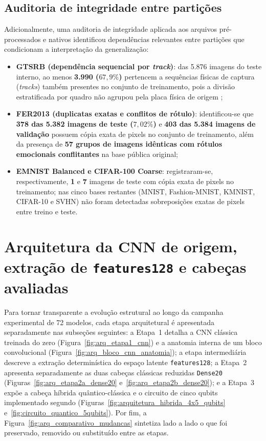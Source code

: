 \documentclass[
    12pt,
    openright,
    oneside,
    a4paper,
    english,
    brazil
]{abntex2}
\begin{document}
\subsection{Auditoria de integridade entre partições}
\label{subsec:auditoria_integridade}

Adicionalmente, uma auditoria de integridade aplicada aos arquivos pré-processados e nativos identificou dependências relevantes entre partições que condicionam a interpretação da generalização:
\begin{itemize}
    \item \textbf{GTSRB (dependência sequencial por \textit{track})}: das 5.876 imagens do teste interno, ao menos \textbf{3.990 (\(67{,}9\%\))} pertencem a sequências físicas de captura (\textit{tracks}) também presentes no conjunto de treinamento, pois a divisão estratificada por quadro não agrupou pela placa física de origem \cite{stallkamp2012gtsrb};
    \item \textbf{FER2013 (duplicatas exatas e conflitos de rótulo)}: identificou-se que \textbf{378 das 5.382 imagens de teste (\(7{,}02\%\))} e \textbf{403 das 5.384 imagens de validação} possuem cópia exata de pixels no conjunto de treinamento, além da presença de \textbf{57 grupos de imagens idênticas com rótulos emocionais conflitantes} na base pública original;
    \item \textbf{EMNIST Balanced e CIFAR-100 Coarse}: registraram-se, respectivamente, \textbf{1} e \textbf{7} imagens de teste com cópia exata de pixels no treinamento; nas cinco bases restantes (MNIST, Fashion-MNIST, KMNIST, CIFAR-10 e SVHN) não foram detectadas sobreposições exatas de pixels entre treino e teste.
\end{itemize}

\section{Arquitetura da CNN de origem, extração de \texttt{features128} e cabeças avaliadas}

Para tornar transparente a evolução estrutural ao longo da campanha experimental de 72 modelos, cada etapa arquitetural é apresentada separadamente nas subseções seguintes: a Etapa~1 detalha a CNN clássica treinada do zero (Figura~\ref{fig:arq_etapa1_cnn}) e a anatomia interna de um bloco convolucional (Figura~\ref{fig:arq_bloco_cnn_anatomia}); a etapa intermediária descreve a extração determinística do espaço latente \texttt{features128}; a Etapa~2 apresenta separadamente as duas cabeças clássicas reduzidas \texttt{Dense20} (Figuras~\ref{fig:arq_etapa2a_dense20} e~\ref{fig:arq_etapa2b_dense20}); e a Etapa~3 expõe a cabeça híbrida quântico-clássica e o circuito de cinco qubits implementado segundo  (Figuras~\ref{fig:arquitetura_hibrida_4x5_qubits} e~\ref{fig:circuito_quantico_5qubits}). Por fim, a Figura~\ref{fig:arq_comparativo_mudancas} sintetiza lado a lado o que foi preservado, removido ou substituído entre as etapas.
\end{document}

